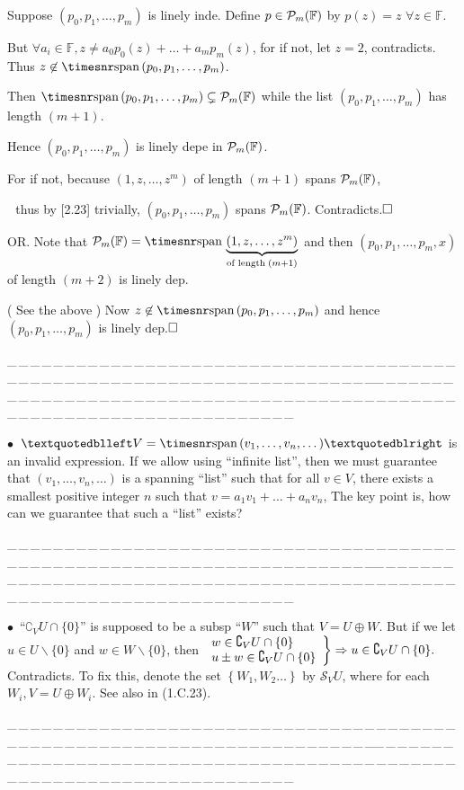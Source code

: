 \documentclass[a4paper, 11pt, UTF8]{article}
\def\Spn{{\timesnr\textup{span}}\,}
\def\Fbb{{\mathbb{F}}}
\def\BulletPoint{{\small$\bullet$}}
\def\Or{\large O{\footnotesize R.} }
\def\ProblemEnding{{\tiny \_\,\_\,\_\,\_\,\_\,\_\,\_\,\_\,\_\,\_\,\_\,\_\,\_\,\_\,\_\,\_\,\_\,\_\,\_\,\_\,\_\,\_\,\_\,\_\,\_\,\_\,\_\,\_\,\_\,\_\,\_\,\_\,\_\,\_\,\_\,\_\,\_\,\_\,\_\,\_\,\_\,\_\,\_\,\_\,\_\,\_\,\_\,\_\,\_\,\_\,\_\,\_\,\_\,\_\,\_\,\_\,\_\,\_\,\_\,\_\,\_\,\_\,\_\,\_\,\_\,\_\,\_\,\_\,\_\,\_\,\_\_\,\_\,\_\,\_\,\_\,\_\,\_\,\_\,\_\,\_\,\_\,\_\,\_\,\_\,\_\,\_\,\_\,\_\,\_\,\_\,\_\,\_\,\_\,\_\,\_\,\_\,\_\,\_\,\_\,\_\,\_\,\_\,\_\,\_\,\_\,\_\,\_\,\_\,\_\,\_\,\_\,\_\,\_\,\_\,\_\,\_\,\_\,\_\,\_\,\_\,\_\,\_\,\_\,\_\,\_\,\_\,\_\,\_\,\_\,\_\,\_\,\_\,\_\,\_\,\_\,\_\,\_\,\_\,\_\,\_\,\_}}
\def\ChapterEnding{\rightline{\timesbfx\Large{E{\small NDED}}}\par\vspace{6pt}}
\begin{document}
\begin{large}
\par\quad
Suppose $(p_0,p_1,\dots,p_m)$ is linely inde. Define $p\in\PoF{m}$ by $p(z)=z\,\,\forall z\in\Fbb.$\par\quad
But $\forall a_i\in\Fbb,z\neq a_0 p_0(z)+\dots+a_m p_m(z)$, for if not, let $z=2$, contradicts.
Thus $z\not\in\Spn(p_0,p_1,\dots,p_m)$.\par\quad
Then $\Spn(p_0,p_1,\dots,p_m)\subsetneq\PoF{m}$ while the list $(p_0,p_1,\dots,p_m)$ has length $(m+1)$.\par\quad
Hence $(p_0,p_1,\dots,p_m)$ is linely depe in $\PoF{m}$.\par\quad
For if not, because $(1,z,\dots,z^m)$ of length $(m+1)$ spans $\PoF{m}$,\par\qquad\qquad\quad\,\,
thus by [2.23] trivially, $(p_0,p_1,\dots,p_m)$ spans $\PoF{m}$. Contradicts.$\hfill\square$\vspace{10pt}\par\quad
\Or Note that $\PoF{m}=\Spn\underbrace{(1,z,\dots,z^m)}_{\textup{of length\;}(m+1)}$ and then $(p_0,p_1,\dots,p_m,x)$ of length $(m+2)$ is linely dep.\par\quad
( See the above ) Now $z\not\in\Spn(p_0,p_1,\dots,p_m)$ and hence $(p_0,p_1,\dots,p_m)$ is linely dep.$\hfill\square$\par
\ProblemEnding\par
\ChapterEnding


\BulletPoint \,\hspace{1pt}\TextB{}
$“V=\Spn(v_1,\dots,v_n,\dots)”$ is an invalid expression.\TextB{}
If we allow using $“$infinite list$”$, then we must guarantee that $(v_1,\dots,v_n,\dots)$ is a spanning $“$list$”$\TextB{}
such that for all $v\in V$, there exists a smallest positive integer $n$ such that $v=a_1 v_1+\dots+a_n v_n$,\TextB{}
The key point is, how can we guarantee that such a $“$list$”$ exists?\par
\ProblemEnding\par

\BulletPoint \,\hspace{1pt}
$“\complement_V U \cap \{0\}”$ is supposed to be a subsp $“W”$ such that $V=U\oplus W$.\TextB{}
But if we let $u\in U\backslash\{0\}$ and $w\in W\backslash\{0\}$, then $\MathRightBrace{l}{w\in\complement_V U \cap \{0\}\\ u\pm w\in\complement_V U \cap \{0\} }\Rightarrow u\in\complement_V U \cap \{0\}.$ Contradicts.\TextB{}
To fix this, {\Large denote the set $\left\{W_1,W_2\dots\right\}$ by $\mathcal{S}_V U$,} {\small where for each $W_i,V=U\oplus W_i$. See also in (1.C.23).}\par\ProblemEnding\par


\end{large}
\end{document}
